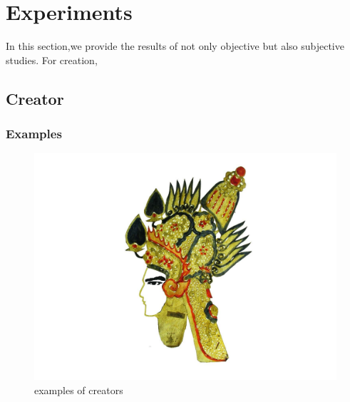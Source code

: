 \documentclass[letter]{sig-alternate}
\begin{document}


\section{Experiments} \label{sec:exp}

In this section,we provide the results of not only objective but also subjective studies. For creation,



\subsection{Creator}




\subsubsection{Examples}


\begin{figure}[t]
\begin{center}
\includegraphics[scale=0.4]{figure/result_example.pdf}
\caption{\small{examples of creators}}
\label{fig:firstfig}
\end{center}
\end{figure}
\end{document}
